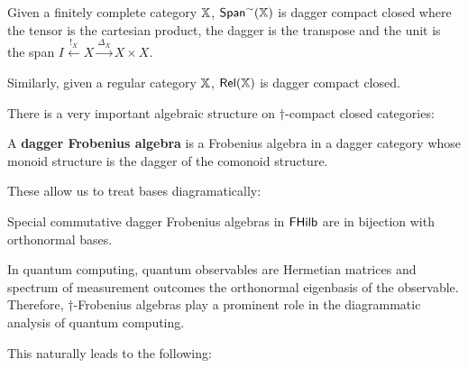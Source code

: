 \begin{example}
Given a finitely complete category $\mathbb{X}$, $\mathsf{Span}^\sim (\mathbb{X})$ is dagger compact closed where the tensor is the cartesian product, the dagger is the transpose and the unit is the span $I \xleftarrow{!_X}  X \xrightarrow{\Delta_X} X \times X$.

Similarly, given a regular category $\mathbb{X}$, $\mathsf{Rel}(\mathbb{X})$ is  dagger compact closed.
\end{example}

There is a very important algebraic structure on $\dag$-compact closed categories:

\begin{definition}
\label{def:specialdagfa}
A {\bf dagger Frobenius algebra}  is a Frobenius algebra in a dagger category whose monoid structure is the dagger of the comonoid structure.

\end{definition}

These allow us to treat bases diagramatically:
\begin{lemma}
\label{lem:specialdagfa}

Special commutative dagger Frobenius algebras in $\mathsf{FHilb}$ are in bijection with orthonormal bases.
\end{lemma}

In quantum computing, quantum observables are Hermetian matrices and spectrum of measurement outcomes the orthonormal eigenbasis of the observable.  Therefore, $\dag$-Frobenius algebras play a prominent role in the diagrammatic analysis of quantum computing.

This naturally leads to the following:

